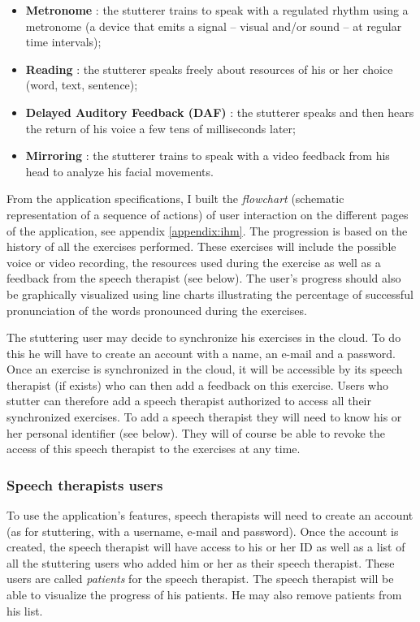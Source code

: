 \begin{itemize}
  \item \textbf{Metronome} : the stutterer trains to speak with a regulated rhythm using a metronome (a device that emits a signal -- visual and/or sound -- at regular time intervals);
  \item \textbf{Reading} : the stutterer speaks freely about resources of his or her choice (word, text, sentence);
  \item \textbf{Delayed Auditory Feedback (DAF)} : the stutterer speaks and then hears the return of his voice a few tens of milliseconds later;
  \item \textbf{Mirroring} : the stutterer trains to speak with a video feedback from his head to analyze his facial movements.
\end{itemize}

From the application specifications, I built the \textit{flowchart} (schematic representation of a sequence of actions) of user interaction on the different pages of the application, see appendix \ref{appendix:ihm}. The progression is based on the history of all the exercises performed. These exercises will include the possible voice or video recording, the resources used during the exercise as well as a feedback from the speech therapist (see below). The user's progress should also be graphically visualized using line charts illustrating the percentage of successful pronunciation of the words pronounced during the exercises.

The stuttering user may decide to synchronize his exercises in the cloud. To do this he will have to create an account with a name, an e-mail and a password. Once an exercise is synchronized in the cloud, it will be accessible by its speech therapist (if exists) who can then add a feedback on this exercise. Users who stutter can therefore add a speech therapist authorized to access all their synchronized exercises. To add a speech therapist they will need to know his or her personal identifier (see below). They will of course be able to revoke the access of this speech therapist to the exercises at any time.

\subsubsection{Speech therapists users}

To use the application's features, speech therapists will need to create an account (as for stuttering, with a username, e-mail and password). Once the account is created, the speech therapist will have access to his or her ID as well as a list of all the stuttering users who added him or her as their speech therapist. These users are called \textit{patients} for the speech therapist. The speech therapist will be able to visualize the progress of his patients. He may also remove patients from his list.















